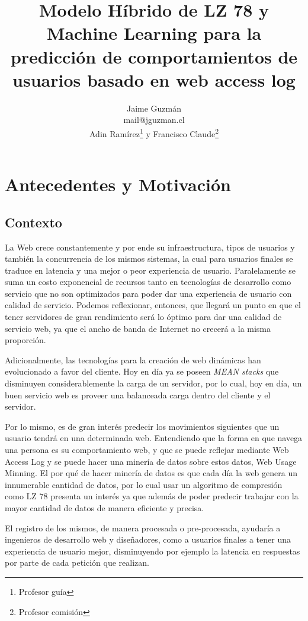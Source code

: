 \documentclass{udparticle}
\title{ Modelo Híbrido de LZ 78 y Machine Learning para la predicción de comportamientos de usuarios basado en web access log }
\author{  
  Jaime Guzmán\\{\small\ttfamily mail@jguzman.cl}\protect\\[5pt]%
  {\small Adin Ramírez\thanks{Profesor guía} y Francisco Claude\thanks{Profesor comisión}}%
  }
\begin{document}
\maketitle

\section{Antecedentes y Motivación}

\subsection{Contexto}

  La Web crece constantemente y por ende su infraestructura, tipos de usuarios y  también la concurrencia de los mismos sistemas, la cual para usuarios finales
  se traduce en latencia y una mejor o peor experiencia de usuario. 
  Paralelamente se suma un costo exponencial de recursos tanto en tecnologías de desarrollo como servicio que no son optimizados para poder dar una experiencia de usuario con calidad de servicio. Podemos reflexionar, entonces, que llegará un punto en que el tener servidores de gran rendimiento será lo óptimo para dar una calidad de servicio web, ya que el ancho de banda de Internet no crecerá a la misma proporción.
   
  Adicionalmente, las tecnologías para la creación de web dinámicas han evolucionado a favor del cliente.
  Hoy en día ya se poseen \emph{MEAN stacks} que disminuyen considerablemente la carga de un servidor, por lo cual, hoy en día, un buen servicio web es proveer una balanceada carga dentro del cliente y el servidor.

  Por lo mismo, es de gran interés predecir los movimientos siguientes que un usuario tendrá en una determinada web.
  Entendiendo que la forma en que navega una persona es su comportamiento web, y que se puede reflejar mediante Web Access Log y se puede hacer una minería de datos sobre estos datos, Web Usage Minning. El por qué de hacer minería de datos es que cada día la web genera un innumerable cantidad de datos, por lo cual usar un algoritmo de compresión como LZ 78 presenta un interés ya que además de poder predecir trabajar con la mayor cantidad de datos de manera eficiente y precisa.
  
  El registro de los mismos, de manera procesada o pre-procesada, ayudaría a ingenieros de desarrollo web y diseñadores, como a  usuarios finales a tener una experiencia de usuario mejor, disminuyendo por ejemplo la latencia en respuestas por parte de cada petición que realizan.
  
\end{document}
